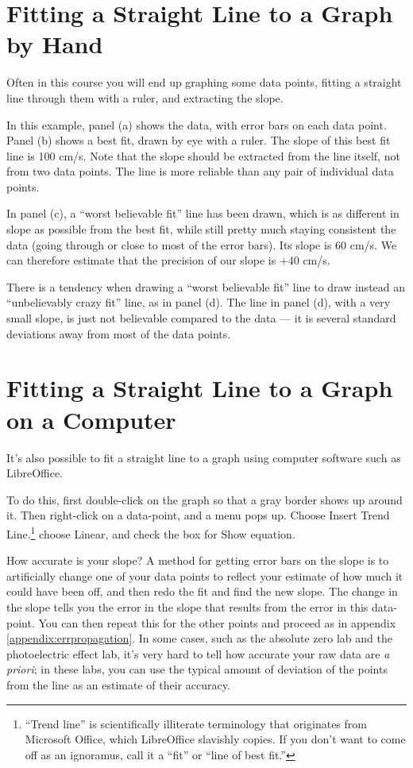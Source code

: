 \section{Fitting a Straight Line to a Graph by Hand}

Often in this course you will end up graphing some data
points, fitting a straight line through them with a ruler,
and extracting the slope.


In this example, panel (a) shows the data, with error bars
on each data point. Panel (b) shows a best fit, drawn by eye
with a ruler. The slope of this best fit line is 100 cm/s.
Note that the slope should be extracted from the line
itself, not from two data points. The line is more reliable
than any pair of individual data points.

In panel (c), a ``worst believable fit'' line has been
drawn, which is as different in slope as possible from the
best fit, while still pretty much staying consistent the
data (going through or close to most of the error bars). Its
slope is 60 cm/s. We can therefore estimate that the
precision of our slope is +40 cm/s.

There is a tendency when drawing a ``worst believable fit''
line to draw instead an ``unbelievably crazy fit'' line, as
in panel (d). The line in panel (d), with a very small
slope, is just not believable compared to the data --- it is
several standard deviations away from most of the data points.

\section{Fitting a Straight Line to a Graph on a Computer}
It's also possible to fit a straight line to a graph using computer
software such as LibreOffice. 

To do this, first double-click on the graph so that a gray border shows up around
it. Then right-click on a data-point, and a menu pops up. 
Choose Insert Trend Line.\footnote{``Trend line'' is scientifically illiterate terminology
that originates from Microsoft Office, which LibreOffice slavishly copies. If you
don't want to come off as an ignoramus, call it a ``fit'' or ``line of best fit.''
} choose Linear, and check the box for Show equation.

How accurate is your slope? A method for getting error bars on the slope
is to artificially change one of your data
points to reflect your estimate of how much it could have been off,
and then redo the fit and find the new slope. The change in the slope
tells you the error in the slope that results from the error in this
data-point. You can then repeat this for the other points and
proceed as in appendix \ref{appendix:errpropagation}. In some cases, such as the absolute zero
lab and the photoelectric effect lab, it's very hard to tell how accurate
your raw data are \emph{a priori}; in these labs, you can use the typical
amount of deviation of the points from the line as an estimate of their
accuracy.

